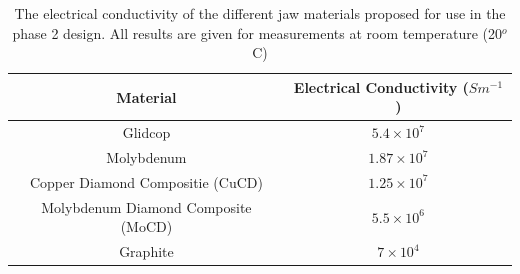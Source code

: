 \begin{table}
\caption{The electrical conductivity of the different jaw materials proposed for use in the phase 2 design. All results are given for measurements at room temperature (20$^{o}$C)}
\begin{center}
\begin{tabular}{c | c }
Material & Electrical Conductivity ($S m^{-1}$)\\ \hline
Glidcop & $5.4 \times 10^{7}$ \\ \hline
Molybdenum & $1.87 \times 10^{7}$ \\ \hline
Copper Diamond Compositie (CuCD) & $1.25 \times 10^{7}$ \\ \hline
Molybdenum Diamond Composite (MoCD) & $5.5 \times 10^{6}$ \\ \hline
Graphite & $7 \times 10^{4}$ \\ \hline
\end{tabular}
\end{center}
\label{tab:phase2-cond}
\end{table}

